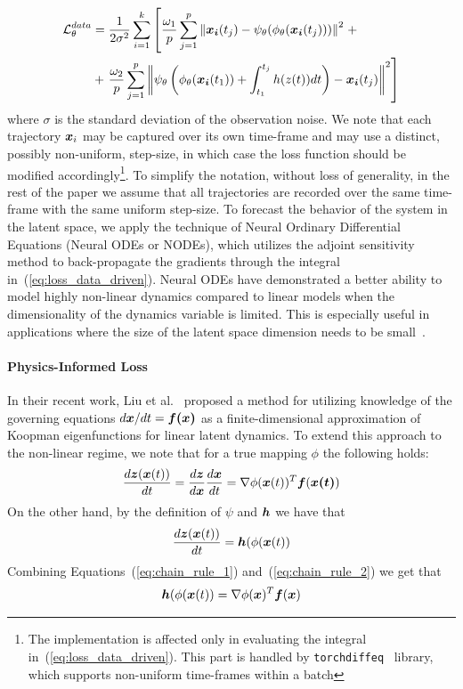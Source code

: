 \begin{align}
    \label{eq:loss_data_driven}
    \operatorname{\mathcal{L}}^{data}_\theta & = \frac{1}{2\sigma^2}\sum_{i = 1}^k \left[\frac{\omega_1}{p}\sum_{j=1}^p\left\|\boldsymbol{x_i}(t_j) - \psi_\theta(\phi_\theta(\boldsymbol{x_i}(t_j)))\right\|^2\right. + \\
     & + \left.\frac{\omega_2}{p}\sum_{j=1}^p \left\|\psi_\theta\left(\phi_\theta(\boldsymbol{x_i}(t_1)) + \int_{t_1}^{t_j}h(z(t))dt\right) - \boldsymbol{x_i}(t_j)\right\|^2 \right]
\end{align}
where $\sigma$ is the standard deviation of the observation noise. We note that each trajectory $\boldsymbol{x}_i$ may be captured over its own time-frame and may use a distinct, possibly non-uniform, step-size, in which case the loss function should be modified accordingly\footnote{The implementation is affected only in evaluating the integral in~(\ref{eq:loss_data_driven}). This part is handled by \texttt{torchdiffeq}~\cite{chen2018neural} library, which supports non-uniform time-frames within a batch}. To simplify the notation, without loss of generality, in the rest of the paper we assume that all trajectories are recorded over the same time-frame with the same uniform step-size. To forecast the behavior of the system in the latent space, we apply the technique of Neural Ordinary Differential Equations (Neural ODEs or NODEs)\cite{chen2018neuralode}, which utilizes the adjoint sensitivity method to back-propagate the gradients through the integral in~(\ref{eq:loss_data_driven}). Neural ODEs have demonstrated a better ability to model highly non-linear dynamics compared to linear models when the dimensionality of the dynamics variable is limited. This is especially useful in applications where the size of the latent space dimension needs to be small~\cite{lee2020model,gin2021deep,champion2019data,kim2019deep}.

\paragraph{Physics-Informed Loss} In their recent work, Liu et al.~\cite{liu2022physics} proposed a method for utilizing knowledge of the governing equations $d\boldsymbol{x}/dt = \boldsymbol{f(x)}$ as a finite-dimensional approximation of Koopman eigenfunctions for linear latent dynamics. To extend this approach to the non-linear regime, we note that for a true mapping $\phi$ the following holds:
\begin{equation}
    \label{eq:chain_rule_1}
    \frac{d\boldsymbol{z}(\boldsymbol{x}(t))}{dt} = \frac{d\boldsymbol{z}}{d\boldsymbol{x}}\frac{d\boldsymbol{x}}{dt} = \nabla\phi(\boldsymbol{x}(t))^T\boldsymbol{f}(\boldsymbol{x(t)})
\end{equation}
On the other hand, by the definition of $\psi$ and $\boldsymbol{h}$ we have that
\begin{equation}
    \label{eq:chain_rule_2}
    \frac{d\boldsymbol{z}(\boldsymbol{x}(t))}{dt} = \boldsymbol{h}(\phi(\boldsymbol{x}(t))
\end{equation}
Combining Equations~(\ref{eq:chain_rule_1}) and~(\ref{eq:chain_rule_2}) we get that
\begin{equation}
    \label{eq:physsics_informed_equation}
    \boldsymbol{h}(\phi(\boldsymbol{x}(t)) = \nabla\phi(\boldsymbol{x})^T\boldsymbol{f}(\boldsymbol{x})
\end{equation}

